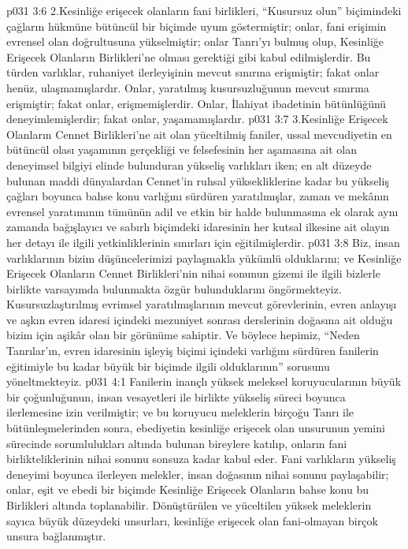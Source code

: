 \vs p031 3:6 2.\bibnobreakspace Kesinliğe erişecek olanların fani birlikleri, “Kusursuz olun” biçimindeki çağların hükmüne bütüncül bir biçimde uyum göstermiştir; onlar, fani erişimin evrensel olan doğrultusuna yükselmiştir; onlar Tanrı’yı bulmuş olup, Kesinliğe Erişecek Olanların Birlikleri’ne olması gerektiği gibi kabul edilmişlerdir. Bu türden varlıklar, ruhaniyet ilerleyişinin mevcut sınırına erişmiştir; fakat onlar henüz,  ulaşmamışlardır. Onlar, yaratılmış kusursuzluğunun mevcut sınırına erişmiştir; fakat onlar,  erişmemişlerdir. Onlar, İlahiyat ibadetinin bütünlüğünü deneyimlemişlerdir; fakat onlar,  yaşamamışlardır.
\vs p031 3:7 3.\bibnobreakspace Kesinliğe Erişecek Olanların Cennet Birlikleri’ne ait olan yüceltilmiş faniler, ussal mevcudiyetin en bütüncül olası yaşamının gerçekliği ve felsefesinin her aşamasına ait olan deneyimsel bilgiyi elinde bulunduran yükseliş varlıkları iken; en alt düzeyde bulunan maddi dünyalardan Cennet’in ruhsal yüksekliklerine kadar bu yükseliş çağları boyunca bahse konu varlığını sürdüren yaratılmışlar, zaman ve mekânın evrensel yaratımının tümünün adil ve etkin bir halde bulunmasına ek olarak aynı zamanda bağışlayıcı ve sabırlı biçimdeki idaresinin her kutsal ilkesine ait olayın her detayı ile ilgili yetkinliklerinin sınırları için eğitilmişlerdir.
\vs p031 3:8 Biz, insan varlıklarının bizim düşüncelerimizi paylaşmakla yükümlü olduklarını; ve Kesinliğe Erişecek Olanların Cennet Birlikleri’nin nihai sonunun gizemi ile ilgili bizlerle birlikte varsayımda bulunmakta özgür bulunduklarını öngörmekteyiz. Kusursuzlaştırılmış evrimsel yaratılmışlarının mevcut görevlerinin, evren anlayışı ve aşkın evren idaresi içindeki mezuniyet sonrası derslerinin doğasına ait olduğu bizim için aşikâr olan bir görünüme sahiptir. Ve böylece hepimiz, “Neden Tanrılar’ın, evren idaresinin işleyiş biçimi içindeki varlığını sürdüren fanilerin eğitimiyle bu kadar büyük bir biçimde ilgili olduklarının” sorusunu yöneltmekteyiz.
\vs p031 4:1 Fanilerin inançlı yüksek meleksel koruyucularının büyük bir çoğunluğunun, insan vesayetleri ile birlikte yükseliş süreci boyunca ilerlemesine izin verilmiştir; ve bu koruyucu meleklerin birçoğu Tanrı ile bütünleşmelerinden sonra, ebediyetin kesinliğe erişecek olan unsurunun yemini sürecinde sorumlulukları altında bulunan bireylere katılıp, onların fani birlikteliklerinin nihai sonunu sonsuza kadar kabul eder. Fani varlıkların yükseliş deneyimi boyunca ilerleyen melekler, insan doğasının nihai sonunu paylaşabilir; onlar, eşit ve ebedi bir biçimde Kesinliğe Erişecek Olanların bahse konu bu Birlikleri altında toplanabilir. Dönüştürülen ve yüceltilen yüksek meleklerin sayıca büyük düzeydeki unsurları, kesinliğe erişecek olan fani\hyp{}olmayan birçok unsura bağlanmıştır.
